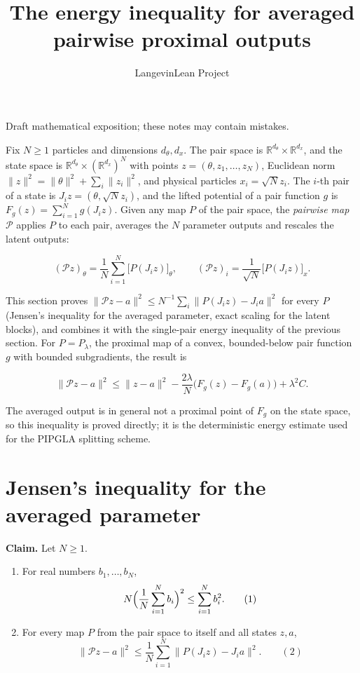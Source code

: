 \documentclass[11pt,a4paper]{article}
\title{\texorpdfstring{The energy inequality for averaged pairwise proximal outputs}{The energy inequality for averaged pairwise proximal outputs}}
\author{LangevinLean Project}
\date{}
\begin{document}
\maketitle
Draft mathematical exposition; these notes may contain mistakes.


Fix \(N\ge1\) particles and dimensions \(d_\theta,d_x\). The pair space is \(\mathbb R^{d_\theta}\times\mathbb R^{d_x}\), and the state space is \(\mathbb R^{d_\theta}\times(\mathbb R^{d_x})^N\) with points \(z=(\theta,z_1,\dots,z_N)\), Euclidean norm \(\|z\|^2=\|\theta\|^2+\sum_i\|z_i\|^2\), and physical particles \(x_i=\sqrt N z_i\). The \(i\)-th pair of a state is \(J_iz=(\theta,\sqrt Nz_i)\), and the lifted potential of a pair function \(g\) is \(F_g(z)=\sum_{i=1}^Ng(J_iz)\). Given any map \(P\) of the pair space, the \emph{pairwise map} \(\mathcal P\) applies \(P\) to each pair, averages the \(N\) parameter outputs and rescales the latent outputs:


\[(\mathcal Pz)_\theta=\frac1N\sum_{i=1}^N\bigl[P(J_iz)\bigr]_\theta,\qquad(\mathcal Pz)_i=\frac{1}{\sqrt N}\bigl[P(J_iz)\bigr]_x .\]


This section proves \(\|\mathcal Pz-a\|^2\le N^{-1}\sum_i\|P(J_iz)-J_ia\|^2\) for every \(P\) (Jensen's inequality for the averaged parameter, exact scaling for the latent blocks), and combines it with the single-pair energy inequality of the previous section. For \(P=P_\lambda\), the proximal map of a convex, bounded-below pair function \(g\) with bounded subgradients, the result is


\[\|\mathcal Pz-a\|^2\le\|z-a\|^2-\frac{2\lambda}{N}\bigl(F_g(z)-F_g(a)\bigr)+\lambda^2C.\]


The averaged output is in general not a proximal point of \(F_g\) on the state space, so this inequality is proved directly; it is the deterministic energy estimate used for the PIPGLA splitting scheme.


\section{\texorpdfstring{Jensen's inequality for the averaged parameter}{Jensen's inequality for the averaged parameter}}


\textbf{Claim.} Let \(N\ge1\).



\begin{enumerate}


\item For real numbers \(b_1,\dots,b_N\),
\[N\Bigl(\frac1N\sum_{i=1}^Nb_i\Bigr)^2\le\sum_{i=1}^Nb_i^2.\qquad(1)\]

\item For every map \(P\) from the pair space to itself and all states \(z,a\),
\[\|\mathcal Pz-a\|^2\le\frac1N\sum_{i=1}^N\bigl\|P(J_iz)-J_ia\bigr\|^2.\qquad(2)\]

\end{enumerate}
\end{document}
